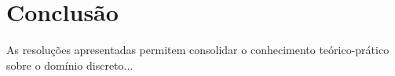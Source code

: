 \documentclass[tcc]{classe_uftex/uftex}
\begin{document}
\chapter{Conclusão}

As resoluções apresentadas permitem consolidar o conhecimento teórico-prático sobre o domínio discreto...

\backmatter 
\singlespacing   

\end{document}
